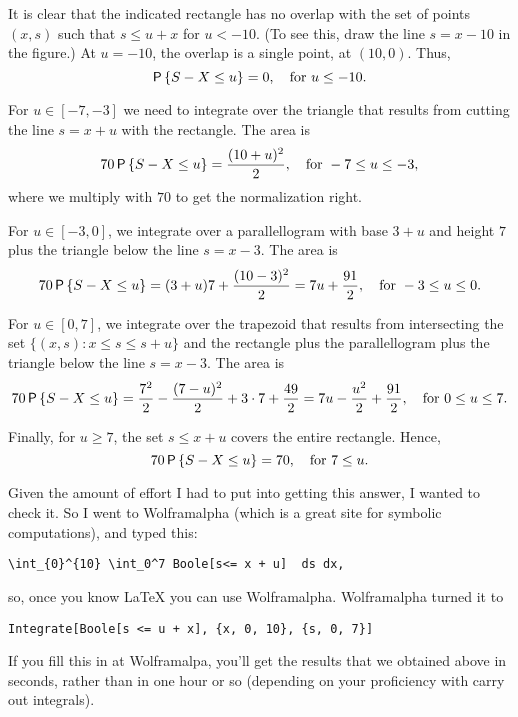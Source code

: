 \begin{exercise}
\begin{solution}
It is clear that  the indicated rectangle has no overlap with the set of points $(x,s)$ such that $s\leq u + x$ for $u<-10$. (To see this, draw the line $s=x-10$ in the figure.) At $u=-10$, the overlap is a single point, at $(10,0)$. Thus, 
\begin{equation*}
\P{S-X \leq u}=0, \quad \text{for } u\leq -10.
\end{equation*}

For $u\in[-7, -3]$ we need to integrate over the triangle that results from cutting the line $s=x+u$ with the rectangle. The area is 
\begin{equation*}
70\, \P{S-X \leq u}= \frac{(10+u)^2}2, \quad \text{for } -7 \leq u\leq -3,
\end{equation*}
where we multiply with $70$ to get the normalization right. 

For $u\in[-3, 0]$, we integrate over a parallellogram with base $3+u$ and height $7$ plus the triangle below the line $s=x-3$. The area is 
\begin{equation*}
70\, \P{S-X \leq u}= (3+u)7 + \frac{(10-3)^2}2=7u + \frac{91}2, \quad \text{for } -3 \leq u\leq 0.
\end{equation*}

For $u\in[0, 7]$, we integrate over the trapezoid that results from intersecting the set $\{(x,s) : x \leq s \leq s + u\}$ and the rectangle plus the parallellogram plus the triangle below the line $s=x-3$. The area is 
\begin{equation*}
70\, \P{S-X \leq u}=  \frac{7^2}2 - \frac{(7-u)^2}{2} + 3\cdot 7 + \frac{49}2 = 7 u - \frac{u^2}2 + \frac{91}2, \quad \text{for } 0\leq u\leq 7.
\end{equation*}

Finally, for $u\geq 7$, the set $s\leq x+u$ covers the entire rectangle. Hence, 
\begin{equation*}
70\, \P{S-X \leq u}=  70, \quad \text{for } 7\leq u.
\end{equation*}

Given the amount of effort I had to put into getting this answer, I wanted to check it. So I went to  Wolframalpha (which is a great site for symbolic computations), and typed this: 
\begin{verbatim}
\int_{0}^{10} \int_0^7 Boole[s<= x + u]  ds dx,
\end{verbatim}
so, once you know \LaTeX\/ you can use Wolframalpha.  Wolframalpha turned it to 
\begin{verbatim}
Integrate[Boole[s <= u + x], {x, 0, 10}, {s, 0, 7}]
\end{verbatim}
If you fill this in at Wolframalpa, you'll get the results that we obtained above in seconds, rather than in one hour or so (depending on your proficiency with carry out integrals).
\end{solution}
\end{exercise}



